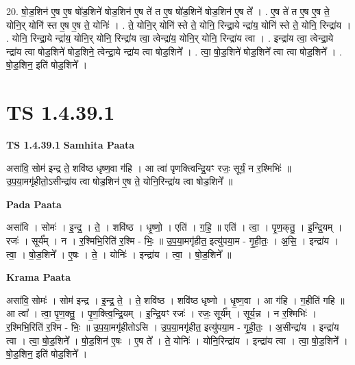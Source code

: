 \documentclass[17pt]{extarticle}
\begin{document}
20. षो॒ड॒शिन॑ ए॒ष ए॒ष षो॑ड॒शिने॑ षोड॒शिन॑ ए॒ष ते॑ त ए॒ष षो॑ड॒शिने॑ षोड॒शिन॑ ए॒ष ते᳚ । . ए॒ष ते॑ त ए॒ष ए॒ष ते॒ योनि॒र् योनि॑ स्त ए॒ष ए॒ष ते॒ योनिः॑ । . ते॒ योनि॒र् योनि॑ स्ते ते॒ योनि॒ रिन्द्रा॒ये न्द्रा॑य॒ योनि॑ स्ते ते॒ योनि॒ रिन्द्रा॑य । . योनि॒ रिन्द्रा॒ये न्द्रा॑य॒ योनि॒र् योनि॒ रिन्द्रा॑य त्वा॒ त्वेन्द्रा॑य॒ योनि॒र् योनि॒ रिन्द्रा॑य त्वा । . इन्द्रा॑य त्वा॒ त्वेन्द्रा॒ये न्द्रा॑य त्वा षोड॒शिने॑ षोड॒शिने॒ त्वेन्द्रा॒ये न्द्रा॑य त्वा षोड॒शिने᳚ । . त्वा॒ षो॒ड॒शिने॑ षोड॒शिने᳚ त्वा त्वा षोड॒शिने᳚ । . षो॒ड॒शिन॒ इति॑ षोड॒शिने᳚ । \newline
\pagebreak
{}
\section*{ TS 1.4.39.1 }

\textbf{TS 1.4.39.1 } \newline
\textbf{Samhita Paata} \newline

असा॑वि॒ सोम॑ इन्द्र ते॒ शवि॑ष्ठ धृष्ण॒वा ग॑हि । आ त्वा॑ पृणक्त्विन्द्रि॒यꣳ रजः॒ सूर्यं॒ न र॒श्मिभिः॑ ॥ उ॒प॒या॒मगृ॑हीतो॒ऽसीन्द्रा॑य त्वा षोड॒शिन॑ ए॒ष ते॒ योनि॒रिन्द्रा॑य त्वा षोड॒शिने᳚ ॥ \newline

\textbf{Pada Paata} \newline

असा॑वि । सोमः॑ । इ॒न्द्र॒ । ते॒ । शवि॑ष्ठ । धृ॒ष्णो॒ । एति॑ । ग॒हि॒ ॥ एति॑ । त्वा॒ । पृ॒ण॒क्‌तु॒ । इ॒न्द्रि॒यम् । रजः॑ । सूर्य᳚म् । न । र॒श्मिभि॒रिति॑ र॒श्मि - भिः॒ ॥ उ॒प॒या॒मगृ॑हीत॒ इत्यु॑पया॒म - गृ॒ही॒तः॒ । अ॒सि॒ । इन्द्रा॑य । त्वा॒ । षो॒ड॒शिने᳚ । ए॒षः । ते॒ । योनिः॑ । इन्द्रा॑य । त्वा॒ । षो॒ड॒शिने᳚ ॥  \newline


\textbf{Krama Paata} \newline

असा॑वि॒ सोमः॑ । सोम॑ इन्द्र । इ॒न्द्र॒ ते॒ । ते॒ शवि॑ष्ठ । शवि॑ष्ठ धृष्णो । धृ॒ष्ण॒वा । आ ग॑हि । ग॒हीति॑ गहि ॥ आ त्वा᳚ । त्वा॒ पृ॒ण॒क्तु॒ । पृ॒ण॒क्त्वि॒न्द्रि॒यम् । इ॒न्द्रि॒यꣳ रजः॑ । रजः॒ सूर्य᳚म् । सूर्य॒न्न । न र॒श्मिभिः॑ । र॒श्मिभि॒रिति॑ र॒श्मि - भिः॒ ॥ उ॒प॒या॒मगृ॑हीतोऽसि । उ॒प॒या॒मगृ॑हीत॒ इत्यु॑पया॒म - गृ॒ही॒तः॒ । अ॒सीन्द्रा॑य । इन्द्रा॑य त्वा । त्वा॒ षो॒ड॒शिने᳚ । षो॒ड॒शिन॑ ए॒षः । ए॒ष ते᳚ । ते॒ योनिः॑ । योनि॒रिन्द्रा॑य । इन्द्रा॑य त्वा । त्वा॒ षो॒ड॒शिने᳚ । षो॒ड॒शिन॒ इति॑ षोड॒शिने᳚ । \newline
\end{document}
